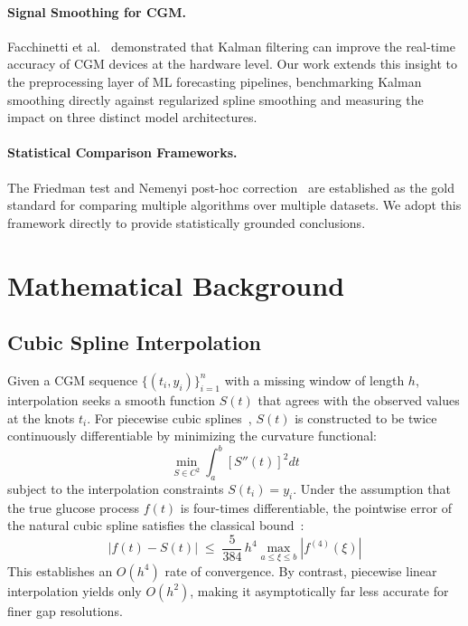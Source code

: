 \documentclass[pmlr,twocolumn,10pt]{jmlr} %
\begin{document}
\paragraph{Signal Smoothing for CGM.}
Facchinetti et al.~\citep{facchinetti2015kalman} demonstrated that Kalman filtering can improve the real-time accuracy of CGM devices at the hardware level. Our work extends this insight to the preprocessing layer of ML forecasting pipelines, benchmarking Kalman smoothing directly against regularized spline smoothing and measuring the impact on three distinct model architectures.

\paragraph{Statistical Comparison Frameworks.}
The Friedman test and Nemenyi post-hoc correction~\citep{demšar2006statistical} are established as the gold standard for comparing multiple algorithms over multiple datasets. We adopt this framework directly to provide statistically grounded conclusions.

\section{Mathematical Background}

\subsection{Cubic Spline Interpolation}

Given a CGM sequence $\{(t_i, y_i)\}_{i=1}^{n}$ with a missing window of length $h$, interpolation seeks a smooth function $S(t)$ that agrees with the observed values at the knots $t_i$. For piecewise cubic splines~\citep{deboor1978practical}, $S(t)$ is constructed to be twice continuously differentiable by minimizing the curvature functional:
\begin{equation}
    \min_{S \in C^2} \int_a^b \left[S''(t)\right]^2 dt
    \label{eq:spline_opt}
\end{equation}
subject to the interpolation constraints $S(t_i) = y_i$. Under the assumption that the true glucose process $f(t)$ is four-times differentiable, the pointwise error of the natural cubic spline satisfies the classical bound~\citep{deboor1978practical}:
\begin{equation}
    |f(t) - S(t)| \;\le\; \frac{5}{384}\, h^4 \max_{a \le \xi \le b}|f^{(4)}(\xi)|
    \label{eq:spline_error}
\end{equation}
This establishes an $O(h^4)$ rate of convergence. By contrast, piecewise linear interpolation yields only $O(h^2)$, making it asymptotically far less accurate for finer gap resolutions.
\end{document}
